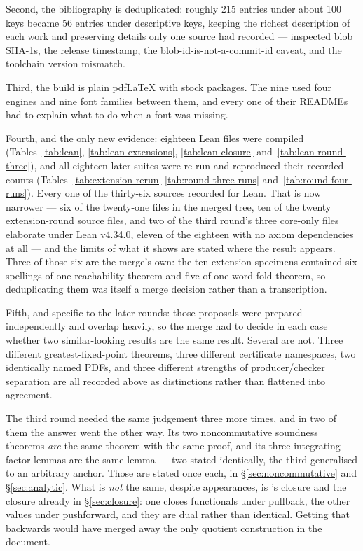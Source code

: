Second, the bibliography is deduplicated: roughly 215  entries
under about 100 keys became 56 entries under descriptive keys, keeping the
richest description of each work and preserving details only one source had
recorded --- inspected blob SHA-1s, the release timestamp, the
blob-id-is-not-a-commit-id caveat, and the  toolchain version
mismatch.

Third, the build is plain pdf\LaTeX{} with stock packages. The nine used four
engines and nine font families between them, and every one of their READMEs had
to explain what to do when a font was missing.

Fourth, and the only new evidence: eighteen Lean files were compiled
(Tables~\ref{tab:lean}, \ref{tab:lean-extensions}, \ref{tab:lean-closure}
and~\ref{tab:lean-round-three}), and all eighteen later suites were re-run and
reproduced their recorded counts (Tables~\ref{tab:extension-rerun}
\ref{tab:round-three-runs} and~\ref{tab:round-four-runs}). Every one of the
thirty-six sources recorded  for Lean. That is now narrower --- six of the twenty-one files
in the merged tree, ten of the twenty extension-round source files, and two of
the third round's three core-only files elaborate under Lean v4.34.0, eleven of
the eighteen with no axiom dependencies at all --- and the limits of what it
shows are stated where the result appears. Three of those
six are the merge's own: the ten extension specimens contained six spellings of
one reachability theorem and five of one word-fold theorem, so deduplicating
them was itself a merge decision rather than a transcription.

Fifth, and specific to the later rounds: those proposals were prepared
independently and overlap heavily, so the merge had to decide in each case
whether two similar-looking results are the same result. Several are not. Three
different greatest-fixed-point theorems, three different certificate namespaces,
two identically named PDFs, and three different strengths of producer/checker
separation are all recorded above as distinctions rather than flattened into
agreement.

The third round needed the same judgement three more times, and in two of them
the answer went the other way. Its two noncommutative soundness theorems
\emph{are} the same theorem with the same proof, and its three
integrating-factor lemmas are the same lemma --- two stated identically, the
third generalised to an arbitrary anchor. Those are stated once each, in
\S\ref{sec:noncommutative} and \S\ref{sec:analytic}. What is \emph{not}
the same, despite appearances, is 's closure and the closure already
in \S\ref{sec:closure}: one closes functionals under pullback, the other
values under pushforward, and they are dual rather than identical. Getting that
backwards would have merged away the only quotient construction in the
document.

